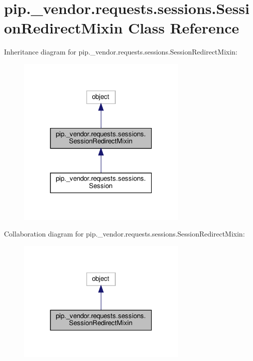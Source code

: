 \hypertarget{classpip_1_1__vendor_1_1requests_1_1sessions_1_1SessionRedirectMixin}{}\section{pip.\+\_\+vendor.\+requests.\+sessions.\+Session\+Redirect\+Mixin Class Reference}
\label{classpip_1_1__vendor_1_1requests_1_1sessions_1_1SessionRedirectMixin}


Inheritance diagram for pip.\+\_\+vendor.\+requests.\+sessions.\+Session\+Redirect\+Mixin\+:
\nopagebreak
\begin{figure}[H]
\begin{center}
\leavevmode
\includegraphics[width=232pt]{classpip_1_1__vendor_1_1requests_1_1sessions_1_1SessionRedirectMixin__inherit__graph}
\end{center}
\end{figure}


Collaboration diagram for pip.\+\_\+vendor.\+requests.\+sessions.\+Session\+Redirect\+Mixin\+:
\nopagebreak
\begin{figure}[H]
\begin{center}
\leavevmode
\includegraphics[width=232pt]{classpip_1_1__vendor_1_1requests_1_1sessions_1_1SessionRedirectMixin__coll__graph}
\end{center}
\end{figure}
